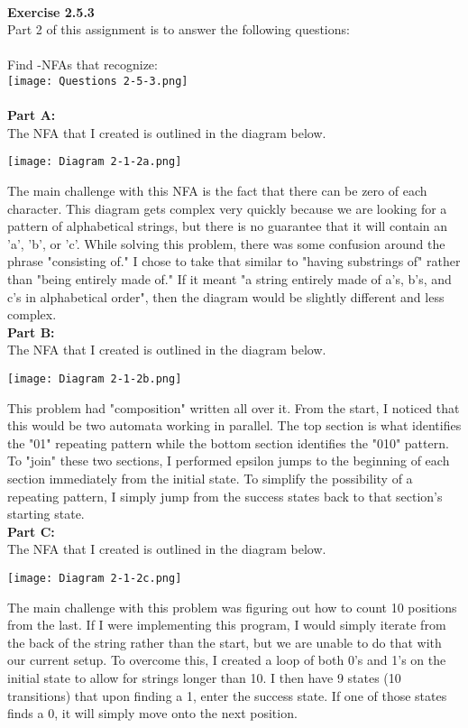 \documentclass{article}
\theoremstyle{theorem}
\theoremstyle{definition}
\theoremstyle{remark}
\begin{document}
\\
\textbf{Exercise 2.5.3}\\
Part 2 of this assignment is to answer the following questions:\\
\\
Find \textepsilon-NFAs that recognize:\\
\texttt{[image: Questions 2-5-3.png]}\\
\\
\textbf{Part A:}\\
The NFA that I created is outlined in the diagram below.
\begin{center}
    \texttt{[image: Diagram 2-1-2a.png]}
\end{center}
The main challenge with this NFA is the fact that there can be zero of each character. This diagram gets complex very quickly because we are looking for a pattern of alphabetical strings, but there is no guarantee that it will contain an 'a', 'b', or 'c'.
While solving this problem, there was some confusion around the phrase "consisting of." I chose to take that similar to "having substrings of" rather than "being entirely made of." If it meant "a string entirely made of a's, b's, and c's in alphabetical order", then the diagram would be slightly different and less complex.\\

\textbf{Part B:}\\
The NFA that I created is outlined in the diagram below.
\begin{center}
    \texttt{[image: Diagram 2-1-2b.png]}
\end{center}
This problem had "composition" written all over it. From the start, I noticed that this would be two automata working in parallel. 
The top section is what identifies the "01" repeating pattern while the bottom section identifies the "010" pattern. 
To "join" these two sections, I performed epsilon jumps to the beginning of each section immediately from the initial state.
To simplify the possibility of a repeating pattern, I simply jump from the success states back to that section's starting state.\\

\textbf{Part C:}\\
The NFA that I created is outlined in the diagram below.
\begin{center}
    \texttt{[image: Diagram 2-1-2c.png]}
\end{center}
The main challenge with this problem was figuring out how to count 10 positions from the last. If I were implementing this program, I would simply iterate from the back of the string rather than the start, but we are unable to do that with our current setup. 
To overcome this, I created a loop of both 0's and 1's on the initial state to allow for strings longer than 10.
I then have 9 states (10 transitions) that upon finding a 1, enter the success state. If one of those states finds a 0, it will simply move onto the next position.\\
\end{document}
